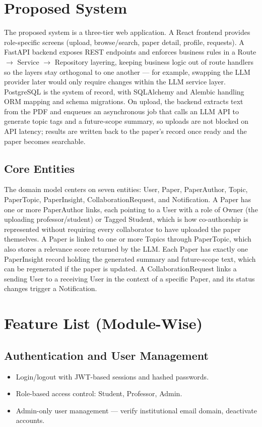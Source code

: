 \documentclass[11pt]{article}
\begin{document}
\section{Proposed System}
The proposed system is a three-tier web application. A React frontend provides role-specific screens (upload, browse/search, paper detail, profile, requests). A FastAPI backend exposes REST endpoints and enforces business rules in a Route $\rightarrow$ Service $\rightarrow$ Repository layering, keeping business logic out of route handlers so the layers stay orthogonal to one another --- for example, swapping the LLM provider later would only require changes within the LLM service layer. PostgreSQL is the system of record, with SQLAlchemy and Alembic handling ORM mapping and schema migrations. On upload, the backend extracts text from the PDF and enqueues an asynchronous job that calls an LLM API to generate topic tags and a future-scope summary, so uploads are not blocked on API latency; results are written back to the paper's record once ready and the paper becomes searchable.

\subsection{Core Entities}
The domain model centers on seven entities: User, Paper, PaperAuthor, Topic, PaperTopic, PaperInsight, CollaborationRequest, and Notification. A Paper has one or more PaperAuthor links, each pointing to a User with a role of Owner (the uploading professor/student) or Tagged Student, which is how co-authorship is represented without requiring every collaborator to have uploaded the paper themselves. A Paper is linked to one or more Topics through PaperTopic, which also stores a relevance score returned by the LLM. Each Paper has exactly one PaperInsight record holding the generated summary and future-scope text, which can be regenerated if the paper is updated. A CollaborationRequest links a sending User to a receiving User in the context of a specific Paper, and its status changes trigger a Notification.

\section{Feature List (Module-Wise)}

\subsection{Authentication and User Management}
\begin{itemize}[itemsep=2pt]
    \item Login/logout with JWT-based sessions and hashed passwords.
    \item Role-based access control: Student, Professor, Admin.
    \item Admin-only user management --- verify institutional email domain, deactivate accounts.
\end{itemize}
\end{document}
